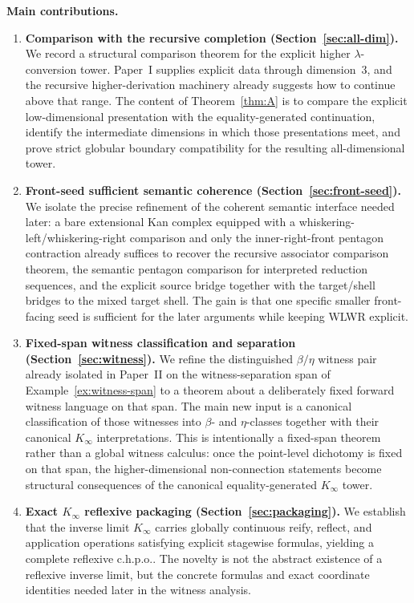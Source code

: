 \documentclass[webpdf,traditional,large,numbered]{oup-authoring-template}
\theoremstyle{thmstyleone}%
\theoremstyle{thmstyletwo}%
\theoremstyle{thmstylethree}%
\newcommand{\Kinf}{K_\infty}
\newcommand{\chpo}{\mathrm{c.h.p.o.}}
\begin{document}
\medskip
\noindent\textbf{Main contributions.}
\begin{enumerate}[label=(\Alph*)]
  \item \textbf{Comparison with the recursive completion
     (Section~\ref{sec:all-dim}).}
    We record a structural comparison theorem for the explicit higher
    $\lambda$-conversion tower.  Paper~I supplies explicit data through
    dimension~$3$, and the recursive higher-derivation machinery already
    suggests how to continue above that range.  The content of
    Theorem~\ref{thm:A} is to compare the explicit low-dimensional presentation
    with the equality-generated continuation, identify the intermediate
    dimensions in which those presentations meet, and prove strict globular
    boundary compatibility for the resulting all-dimensional tower.

  \item \textbf{Front-seed sufficient semantic coherence
    (Section~\ref{sec:front-seed}).}
    We isolate the precise refinement of the coherent semantic interface needed
    later: a bare extensional Kan complex equipped with a
    whiskering-left/whiskering-right comparison and only the
    inner-right-front pentagon contraction already suffices to recover the
    recursive associator comparison theorem, the semantic pentagon comparison
    for interpreted reduction sequences, and the explicit source bridge together
    with the target/shell bridges to the mixed target shell.  The gain is that
    one specific smaller front-facing seed is sufficient for the later
    arguments while keeping WLWR explicit.

  \item \textbf{Fixed-span witness classification and separation
     (Section~\ref{sec:witness}).}
     We refine the distinguished $\beta/\eta$ witness pair already isolated in
     Paper~II on the witness-separation span of
    Example~\ref{ex:witness-span} to a theorem about a deliberately fixed
    forward witness language on that span.  The main new input is a canonical
    classification of those witnesses into $\beta$- and $\eta$-classes together
    with their canonical $\Kinf$ interpretations.  This is intentionally a
    fixed-span theorem rather than a global witness calculus: once the
    point-level dichotomy is fixed on that span, the higher-dimensional
    non-connection statements become structural consequences of the canonical
    equality-generated $\Kinf$ tower.

  \item \textbf{Exact $\Kinf$ reflexive packaging
     (Section~\ref{sec:packaging}).}
    We establish that the inverse limit $\Kinf$ carries globally continuous
    reify, reflect, and application operations satisfying explicit stagewise
    formulas, yielding a complete reflexive $\chpo$.  The novelty is not the
    abstract existence of a reflexive inverse limit, but the concrete formulas
    and exact coordinate identities needed later in the witness analysis.
\end{enumerate}
\end{document}

